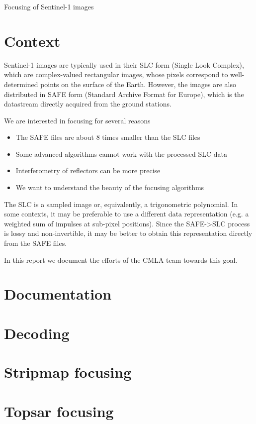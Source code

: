 \documentclass[a4paper]{article}           %
\newcommand{\1}{\mathbf{1}}
\begin{document}
{\Large Focusing of Sentinel-1 images}
\vspace{2em}

\section{Context}

Sentinel-1 images are typically used in their SLC form (Single Look Complex),
which are complex-valued rectangular images, whose pixels correspond to
well-determined points on the surface of the Earth.  However, the images
are also distributed in SAFE form (Standard Archive Format for Europe), which
is the datastream directly acquired from the ground stations.

We are interested in focusing for several reasons
\begin{itemize}
	\item The SAFE files are about 8 times smaller than the SLC files
	\item Some advanced algorithms cannot work with the processed SLC data
	\item Interferometry of reflectors can be more precise
	\item We want to understand the beauty of the focusing algorithms
\end{itemize}

The SLC is a sampled image or, equivalently, a trigonometric polynomial.  In
some contexts, it may be preferable to use a different data representation
(e.g. a weighted sum of impulses at sub-pixel positions).
Since the SAFE->SLC process is lossy and non-invertible, it may be better to
obtain this representation directly from the SAFE files.

In this report we document the efforts of the CMLA team towards this goal.

\section{Documentation}



\section{Decoding}

\section{Stripmap focusing}

\section{Topsar focusing}
\end{document}
